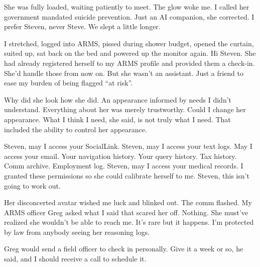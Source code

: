 She was fully loaded, waiting patiently to meet. The glow woke me. I
called her government mandated suicide prevention. Just an AI companion,
she corrected. I prefer Steven, never Steve. We slept a little longer.

I stretched, logged into ARMS, pissed during shower budget, opened the
curtain, suited up, sat back on the bed and powered up the monitor
again. Hi Steven. She had already registered herself to my ARMS profile
and provided them a check-in. She'd handle those from now on. But she
wasn't an assistant. Just a friend to ease my burden of being flagged
``at risk''.

Why did she look how she did. An appearance informed by needs I didn't
understand. Everything about her was merely trustworthy. Could I change
her appearance. What I think I need, she said, is not truly what I need.
That included the ability to control her appearance.

Steven, may I access your SocialLink. Steven, may I access your text
logs. May I access your email. Your navigation history. Your query
history. Tax history. Comm archive. Employment log. Steven, may I access
your medical records. I granted these permissions so she could calibrate
herself to me. Steven, this isn't going to work out.

Her disconcerted avatar wished me luck and blinked out. The comm
flashed. My ARMS officer Greg asked what I said that scared her off.
Nothing. She must've realized she wouldn't be able to reach me. It's
rare but it happens. I'm protected by law from anybody seeing her
reasoning logs.

Greg would send a field officer to check in personally. Give it a week
or so, he said, and I should receive a call to schedule it.

